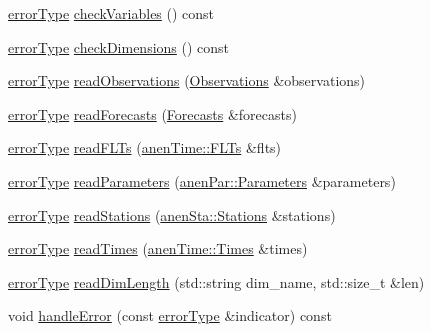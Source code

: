 \begin{DoxyCompactItemize}
\mbox{\hyperlink{class_an_en_i_o_aa56bc1ec6610b86db4349bce20f9ead0}{error\+Type}} \mbox{\hyperlink{class_an_en_i_o_a44347f497bdf775fcf214ec75d8b6470}{check\+Variables}} () const
\item 
\mbox{\hyperlink{class_an_en_i_o_aa56bc1ec6610b86db4349bce20f9ead0}{error\+Type}} \mbox{\hyperlink{class_an_en_i_o_ab6cd06f6402655924002fec4f83195eb}{check\+Dimensions}} () const
\item 
\mbox{\hyperlink{class_an_en_i_o_aa56bc1ec6610b86db4349bce20f9ead0}{error\+Type}} \mbox{\hyperlink{class_an_en_i_o_a41ebcc0c9edee123626bf6e606917a49}{read\+Observations}} (\mbox{\hyperlink{class_observations}{Observations}} \&observations)
\item 
\mbox{\hyperlink{class_an_en_i_o_aa56bc1ec6610b86db4349bce20f9ead0}{error\+Type}} \mbox{\hyperlink{class_an_en_i_o_a912e513e58fa258e1dce67ff161abab2}{read\+Forecasts}} (\mbox{\hyperlink{class_forecasts}{Forecasts}} \&forecasts)
\item 
\mbox{\hyperlink{class_an_en_i_o_aa56bc1ec6610b86db4349bce20f9ead0}{error\+Type}} \mbox{\hyperlink{class_an_en_i_o_aa58735032dd6f54c83d6450842922d3f}{read\+F\+L\+Ts}} (\mbox{\hyperlink{classanen_time_1_1_f_l_ts}{anen\+Time\+::\+F\+L\+Ts}} \&flts)
\item 
\mbox{\hyperlink{class_an_en_i_o_aa56bc1ec6610b86db4349bce20f9ead0}{error\+Type}} \mbox{\hyperlink{class_an_en_i_o_a2b21ff04fcc0464017a5a717a6b19065}{read\+Parameters}} (\mbox{\hyperlink{classanen_par_1_1_parameters}{anen\+Par\+::\+Parameters}} \&parameters)
\item 
\mbox{\hyperlink{class_an_en_i_o_aa56bc1ec6610b86db4349bce20f9ead0}{error\+Type}} \mbox{\hyperlink{class_an_en_i_o_aaec8b46a52f3d8ab904fd4229bd3b9e9}{read\+Stations}} (\mbox{\hyperlink{classanen_sta_1_1_stations}{anen\+Sta\+::\+Stations}} \&stations)
\item 
\mbox{\hyperlink{class_an_en_i_o_aa56bc1ec6610b86db4349bce20f9ead0}{error\+Type}} \mbox{\hyperlink{class_an_en_i_o_a19b454b0a9ecb5ecbc2cc2a9c139770b}{read\+Times}} (\mbox{\hyperlink{classanen_time_1_1_times}{anen\+Time\+::\+Times}} \&times)
\item 
\mbox{\hyperlink{class_an_en_i_o_aa56bc1ec6610b86db4349bce20f9ead0}{error\+Type}} \mbox{\hyperlink{class_an_en_i_o_a5ca1c7df3da9720967d7ed06f2dfe09b}{read\+Dim\+Length}} (std\+::string dim\+\_\+name, std\+::size\+\_\+t \&len)
\item 
void \mbox{\hyperlink{class_an_en_i_o_a92276aeba9c0b5bd1cd3d285271d505f}{handle\+Error}} (const \mbox{\hyperlink{class_an_en_i_o_aa56bc1ec6610b86db4349bce20f9ead0}{error\+Type}} \&indicator) const

\end{DoxyCompactItemize}
